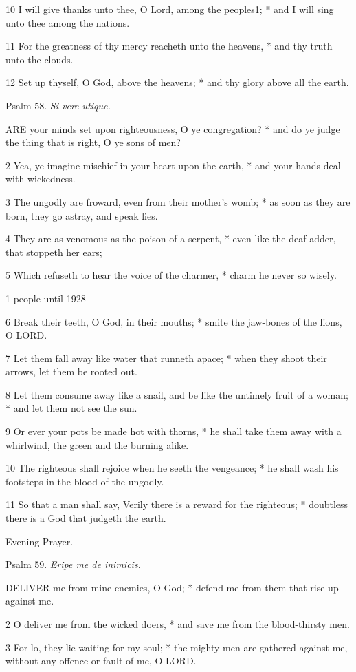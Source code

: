 10 I will give thanks unto thee, O Lord, among the peoples1;
* and I will sing unto thee among the nations.

11 For the greatness of thy mercy reacheth unto the
heavens, * and thy truth unto the clouds.

12 Set up thyself, O God, above the heavens; * and
thy glory above all the earth.

Psalm
58. \emph{Si vere utique.}

ARE
your minds set upon righteousness, O ye congregation? * and do ye judge
the thing that is right, O ye sons of men?

2 Yea, ye imagine mischief in your heart upon the earth,
* and your hands deal with wickedness.

3 The ungodly are froward, even from their mother's
womb; * as soon as they are born, they go astray, and speak lies.

4 They are as venomous as the poison of a serpent,
* even like the deaf adder, that stoppeth her ears;

5 Which refuseth to hear the voice of the charmer,
* charm he never so wisely.

1 people
until 1928

6 Break their teeth, O God, in their mouths; * smite the jaw-bones
of the lions, O LORD.

7 Let them fall away like water that runneth apace;
* when they shoot their arrows, let them be rooted out.

8 Let them consume away like a snail, and be like the
untimely fruit of a woman; * and let them not see the sun.

9 Or ever your pots be made hot with thorns, * he shall
take them away with a whirlwind, the green and the burning alike.

10 The righteous shall rejoice when he seeth the vengeance;
* he shall wash his footsteps in the blood of the ungodly.

11 So that a man shall say, Verily there is a reward
for the righteous; * doubtless there is a God that judgeth the earth.

Evening
Prayer.

Psalm
59. \emph{Eripe me de inimicis.}

DELIVER
me from mine enemies, O God; * defend me from them that rise up against
me.

2 O deliver me from the wicked doers, * and save me
from the blood-thirsty men.

3 For lo, they lie waiting for my soul; * the mighty
men are gathered against me, without any offence or fault of me, O LORD.

